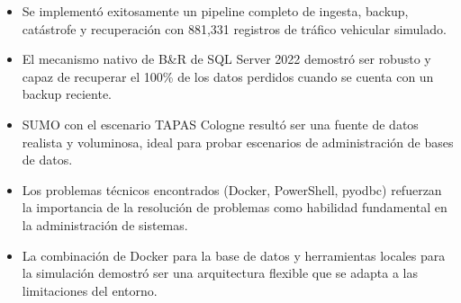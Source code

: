 \documentclass[12pt,a4paper]{article}
\begin{document}
\begin{itemize}
  \item Se implement\'o exitosamente un pipeline completo de ingesta, backup, cat\'astrofe y recuperaci\'on con 881,331 registros de tr\'afico vehicular simulado.

  \item El mecanismo nativo de B\&R de SQL Server 2022 demostr\'o ser robusto y capaz de recuperar el 100\% de los datos perdidos cuando se cuenta con un backup reciente.

  \item SUMO con el escenario TAPAS Cologne result\'o ser una fuente de datos realista y voluminosa, ideal para probar escenarios de administraci\'on de bases de datos.

  \item Los problemas t\'ecnicos encontrados (Docker, PowerShell, pyodbc) refuerzan la importancia de la resoluci\'on de problemas como habilidad fundamental en la administraci\'on de sistemas.

  \item La combinaci\'on de Docker para la base de datos y herramientas locales para la simulaci\'on demostr\'o ser una arquitectura flexible que se adapta a las limitaciones del entorno.
\end{itemize}
\end{document}
